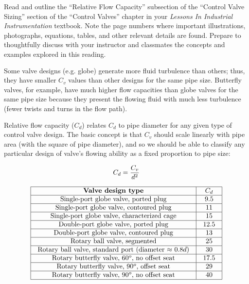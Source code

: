 

Read and outline the ``Relative Flow Capacity'' subsection of the ``Control Valve Sizing'' section of the ``Control Valves'' chapter in your {\it Lessons In Industrial Instrumentation} textbook.  Note the page numbers where important illustrations, photographs, equations, tables, and other relevant details are found.  Prepare to thoughtfully discuss with your instructor and classmates the concepts and examples explored in this reading.














Some valve designs (e.g. globe) generate more fluid turbulence than others; thus, they have smaller $C_v$ values than other designs for the same pipe size.  Butterfly valves, for example, have much higher flow capacities than globe valves for the same pipe size because they present the flowing fluid with much less turbulence (fewer twists and turns in the flow path).

\vskip 10pt

Relative flow capacity ($C_d$) relates $C_d$ to pipe diameter for any given type of control valve design.  The basic concept is that $C_v$ should scale linearly with pipe area (with the square of pipe diameter), and so we should be able to classify any particular design of valve's flowing ability as a fixed proportion to pipe size:

$$C_d = {C_v \over d^2}$$

 

$$\vbox{\offinterlineskip
\halign{\strut
\vrule \quad\hfil # \ \hfil & 
\vrule \quad\hfil # \ \hfil \vrule \cr
\noalign{\hrule}
%
{\bf Valve design type} & $C_d$ \cr
%
\noalign{\hrule}
%
Single-port globe valve, ported plug & 9.5 \cr
%
\noalign{\hrule}
%
Single-port globe valve, contoured plug & 11 \cr
%
\noalign{\hrule}
%
Single-port globe valve, characterized cage & 15 \cr
%
\noalign{\hrule}
%
Double-port globe valve, ported plug & 12.5 \cr
%
\noalign{\hrule}
%
Double-port globe valve, contoured plug & 13 \cr
%
\noalign{\hrule}
%
Rotary ball valve, segmented & 25 \cr
%
\noalign{\hrule}
%
Rotary ball valve, standard port (diameter $\approx$ 0.8$d$) & 30 \cr
%
\noalign{\hrule}
%
Rotary butterfly valve, 60$^{o}$, no offset seat & 17.5 \cr
%
\noalign{\hrule}
%
Rotary butterfly valve, 90$^{o}$, offset seat & 29 \cr
%
\noalign{\hrule}
%
Rotary butterfly valve, 90$^{o}$, no offset seat & 40 \cr
%
\noalign{\hrule}
} %
}$$ %

